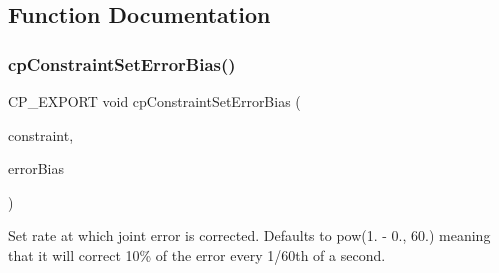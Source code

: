 \subsection{Function Documentation}
\mbox{\label{group__cpConstraint_gacd4448af488e19721f3755f9ddaece9d}} 
\subsubsection{\texorpdfstring{cp\+Constraint\+Set\+Error\+Bias()}{cpConstraintSetErrorBias()}}
{\footnotesize\ttfamily C\+P\+\_\+\+E\+X\+P\+O\+RT void cp\+Constraint\+Set\+Error\+Bias (\begin{DoxyParamCaption}\item[{\hyperlink{structcpConstraint}{cp\+Constraint} $\ast$}]{constraint,  }\item[{cp\+Float}]{error\+Bias }\end{DoxyParamCaption})}

Set rate at which joint error is corrected. Defaults to pow(1. -\/ 0., 60.) meaning that it will correct 10\% of the error every 1/60th of a second. 